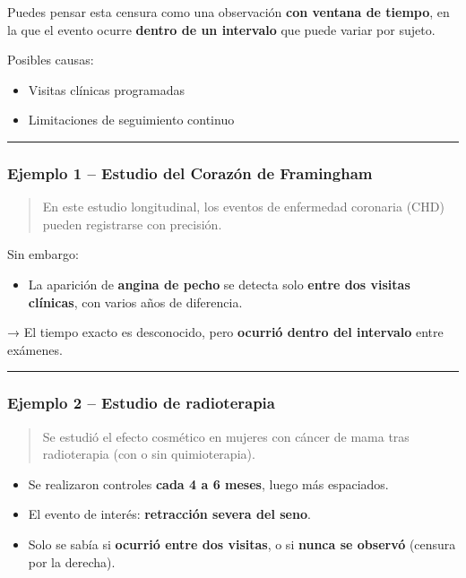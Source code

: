 \documentclass[
  letterpaper,
  DIV=11,
  numbers=noendperiod]{scrartcl}
\providecommand{\tightlist}{%
  \setlength{\itemsep}{0pt}\setlength{\parskip}{0pt}}
\begin{document}
Puedes pensar esta censura como una observación \textbf{con ventana de
tiempo}, en la que el evento ocurre \textbf{dentro de un intervalo} que
puede variar por sujeto.

Posibles causas:

\begin{itemize}
\tightlist
\item
  Visitas clínicas programadas
\item
  Limitaciones de seguimiento continuo
\end{itemize}

\begin{center}\rule{0.5\linewidth}{0.5pt}\end{center}

\subsubsection{Ejemplo 1 -- Estudio del Corazón de
Framingham}\label{ejemplo-1-estudio-del-corazuxf3n-de-framingham}

\begin{quote}
En este estudio longitudinal, los eventos de enfermedad coronaria (CHD)
pueden registrarse con precisión.
\end{quote}

Sin embargo:

\begin{itemize}
\tightlist
\item
  La aparición de \textbf{angina de pecho} se detecta solo \textbf{entre
  dos visitas clínicas}, con varios años de diferencia.
\end{itemize}

→ El tiempo exacto es desconocido, pero \textbf{ocurrió dentro del
intervalo} entre exámenes.

\begin{center}\rule{0.5\linewidth}{0.5pt}\end{center}

\subsubsection{Ejemplo 2 -- Estudio de
radioterapia}\label{ejemplo-2-estudio-de-radioterapia}

\begin{quote}
Se estudió el efecto cosmético en mujeres con cáncer de mama tras
radioterapia (con o sin quimioterapia).
\end{quote}

\begin{itemize}
\tightlist
\item
  Se realizaron controles \textbf{cada 4 a 6 meses}, luego más
  espaciados.
\item
  El evento de interés: \textbf{retracción severa del seno}.
\item
  Solo se sabía si \textbf{ocurrió entre dos visitas}, o si
  \textbf{nunca se observó} (censura por la derecha).
\end{itemize}
\end{document}

